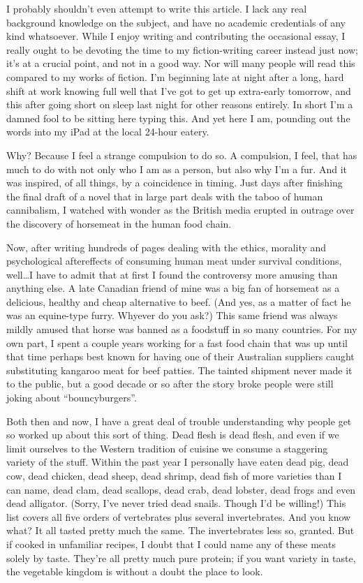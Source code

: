 
I probably shouldn't even attempt to write this article. I lack any real background knowledge on the subject, and have no academic credentials of any kind whatsoever. While I enjoy writing and contributing the occasional essay, I really ought to be devoting the time to my fiction-writing career instead just now; it's at a crucial point, and not in a good way. Nor will many people will read this compared to my works of fiction. I'm beginning late at night after a long, hard shift at work knowing full well that I've got to get up extra-early tomorrow, and this after going short on sleep last night for other reasons entirely. In short I'm a damned fool to be sitting here typing this. And yet here I am, pounding out the words into my iPad at the local 24-hour eatery.

Why? Because I feel a strange compulsion to do so. A compulsion, I feel, that has much to do with not only who I am as a person, but also why I'm a fur. And it was inspired, of all things, by a coincidence in timing. Just days after finishing the final draft of a novel that in large part deals with the taboo of human cannibalism, I watched with wonder as the British media erupted in outrage over the discovery of horsemeat in the human food chain.

Now, after writing hundreds of pages dealing with the ethics, morality and psychological aftereffects of consuming human meat under survival conditions, well\ldots I have to admit that at first I found the controversy more amusing than anything else. A late Canadian friend of mine was a big fan of horsemeat as a delicious, healthy and cheap alternative to beef. (And yes, as a matter of fact he was an equine-type furry. Whyever do you ask?) This same friend was always mildly amused that horse was banned as a foodstuff in so many countries. For my own part, I spent a couple years working for a fast food chain that was up until that time perhaps best known for having one of their Australian suppliers caught substituting kangaroo meat for beef patties. The tainted shipment never made it to the public, but a good decade or so after the story broke people were still joking about ``bouncyburgers''.

Both then and now, I have a great deal of trouble understanding why people get so worked up about this sort of thing. Dead flesh is dead flesh, and even if we limit ourselves to the Western tradition of cuisine we consume a staggering variety of the stuff. Within the past year I personally have eaten dead pig, dead cow, dead chicken, dead sheep, dead shrimp, dead fish of more varieties than I can name, dead clam, dead scallops, dead crab, dead lobster, dead frogs and even dead alligator. (Sorry, I've never tried dead snails. Though I'd be willing!) This list covers all five orders of vertebrates plus several invertebrates. And you know what? It all tasted pretty much the same. The invertebrates less so, granted. But if cooked in unfamiliar recipes, I doubt that I could name any of these meats solely by taste. They're all pretty much pure protein; if you want variety in taste, the vegetable kingdom is without a doubt the place to look.


